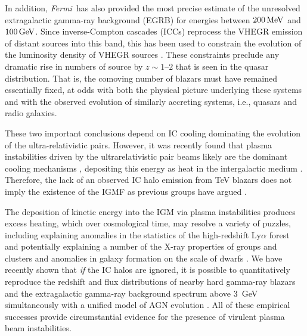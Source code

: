 \documentclass[usenatbib,iop,apj,numberedappendix]{aeb_emulateapj_2015}
\newcommand\qc[1]{{\color{red} \bf #1}}
\def\eV{{\rm eV}} %
\def\MeV{{\rm M}\eV} %
\def\GeV{{\rm G}\eV} %
\def\Fermi{{\em Fermi\ }}
\begin{document}
In addition, \Fermi has also provided the most precise estimate of the unresolved
extragalactic gamma-ray background (EGRB) for energies between
$200\,\MeV$ and $100\,\GeV$.  Since inverse-Compton cascades (ICCs) reprocess the VHEGR emission of
distant sources into this band, this has been used to constrain the
evolution of the luminosity density of VHEGR sources
\citep[see, e.g., ][]{Naru-Tota:06,Knei-Mann:08,Inou-Tota:09,Vent:10}.
These constraints preclude any dramatic rise in numbers of source by $z\sim1$--$2$ that is seen in the quasar
distribution.  That is, the comoving number of blazars must have
remained essentially fixed, at odds with both the physical picture
underlying these systems and with the observed evolution of similarly
accreting systems, i.e., quasars and radio galaxies.

These two important conclusions depend on IC cooling dominating the evolution of the ultra-relativistic pairs.  However, it was recently found that plasma instabilities driven by the
ultrarelativistic pair beams  likely are the dominant cooling mechanisms
\citep{paperI,Schlickeiser+12,Schlickeiser+13}, depositing this energy
as heat in the intergalactic medium \citep{paperII,paperIII}.  Therefore, the lack of an observed
 IC halo emission from TeV blazars does not imply the existence of the IGMF as previous groups have argued
\citep{paperI,Schlickeiser+12,Schlickeiser+13}.


The deposition of kinetic energy into the IGM via plasma instabilities produces excess heating, which over cosmological time, may resolve a variety
of puzzles, including explaining
anomalies in the statistics of the high-redshift Ly$\alpha$ forest
\citep{paperIV,2015ApJ...811...19L} and potentially explaining a number of the X-ray
properties of groups and clusters and anomalies in galaxy formation on
the scale of dwarfs \citep{paperIII,Lu+2013}.  We
have recently shown that \textit{if} the IC halos are ignored, it is possible
to quantitatively reproduce the redshift and flux distributions
of nearby hard gamma-ray blazars and the extragalactic gamma-ray background
spectrum above 3~GeV simultaneously with a unified model of AGN evolution
\citep{Broderick+2013,Broderick+2013b}.  All of these empirical successes provide
circumstantial evidence for the presence of virulent plasma beam
instabilities. 
\end{document}
